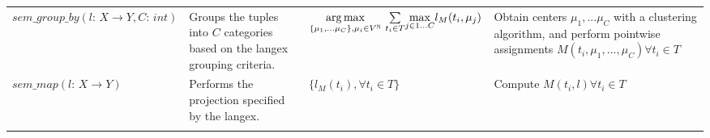 \begin{footnotesize}
\begin{table}[!t]
\begin{tabular}{C{4.1cm}C{5cm}C{4.1cm}C{4.2cm}}
$\mathit{sem\_group\_by}(l\textit{: } X \rightarrow Y\comma C\textit{: } int)$ & Groups the tuples into $C$ categories based on the langex grouping criteria. 
& $\underset{\{\mu_1, ...\mu_C\}, \mu_i \in V^\mathbb{N}}{\operatorname*{arg\,max}}\textit{\space} \underset{t_i\in T}\sum \underset{j\in 1\ldots C}\max l_{M}(t_i, \mu_j)$
& Obtain centers $\mu_1, ...\mu_C$ with a clustering algorithm, and perform pointwise assignments $M(t_i, \mu_1, ..., \mu_C) \forall t_i\in T$\\

$\mathit{sem\_map}(l\textit{: } X \rightarrow Y)$ & Performs the projection specified by the langex. 
& $\{l_M(t_i), \forall t_i \in T\}$
& Compute $M(t_i, l) \forall t_i\in T$\\

\bottomrule
\label{tab:operators}

\end{tabular}
\vspace{-1.0cm}

\end{table}

\end{footnotesize}



